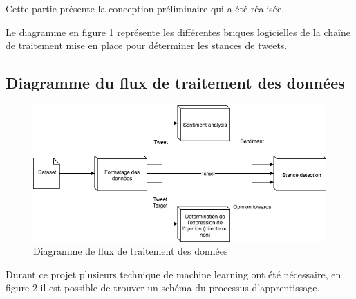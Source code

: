 \par Cette partie présente la conception préliminaire qui a été réalisée. \\

\par Le diagramme en figure 1 représente les différentes briques logicielles de la chaîne de traitement mise en place pour déterminer les stances de tweets.

\subsection{Diagramme du flux de traitement des données}
\begin{figure}[h!]
	\centerline{\includegraphics[scale=0.8]{img/diagramme_flux_traitement.png}}
	\caption{Diagramme de flux de traitement des données}
	\label{flux_diagram}
\end{figure}
\newpage


\par Durant ce projet plusieurs technique de machine learning ont été nécessaire, en figure 2 il est possible de trouver un schéma du processus d'apprentissage. \\

